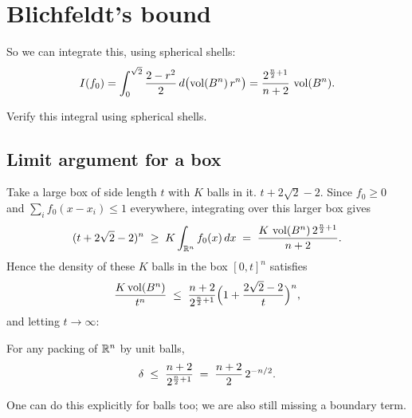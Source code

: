 \section{Blichfeldt's bound}\label{L2:sec:bound}

So we can integrate this, using spherical shells:
\[
I(f_0)=\int_0^{\sqrt2}\frac{2-r^2}{2}\,d\bigl(\operatorname{vol}(B^n)\,r^n\bigr)
=\frac{2^{\frac n2+1}}{n+2}\,\operatorname{vol}(B^n).
\]

\begin{exercise}\label{L2:ex:integral}
Verify this integral using spherical shells. 
\end{exercise}

\subsection*{Limit argument for a box}

Take a large box of side length $t$ with $K$ balls in it.
 $t+2\sqrt2-2$. Since $f_0\ge 0$ and
$\sum_if_0(x-x_i)\le1$ everywhere, integrating over this larger box gives
\[
(t+2\sqrt2-2)^n\;\ge\;K\int_{\mathbb{R}^n}f_0(x)\,dx\;=\;\frac{K\,\operatorname{vol}(B^n)\,2^{\frac n2+1}}{n+2}.
\]
Hence the density of these $K$ balls in the box $[0,t]^n$ satisfies
\[
\frac{K\operatorname{vol}(B^n)}{t^n}\;\le\;\frac{n+2}{2^{\frac n2+1}}\Bigl(1+\frac{2\sqrt2-2}{t}\Bigr)^n,
\]
and letting $t\to\infty$:

\begin{theorem}\label{L2:thm:blichfeldt}
For any packing of $\mathbb{R}^n$ by unit balls,
\[
\delta\;\le\;\frac{n+2}{2^{\frac n2+1}} \;=\; \frac{n+2}{2}\,2^{-n/2}.
\]
\end{theorem}

One can do this explicitly for balls too; we are also still missing a boundary term.

\begin{remark}
\end{remark}

